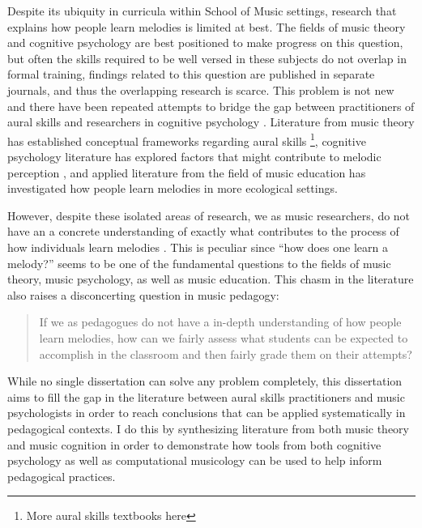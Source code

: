 \documentclass[]{book}
\let\rmarkdownfootnote\footnote%
\def\footnote{\protect\rmarkdownfootnote}
\begin{document}
Despite its ubiquity in curricula within School of Music settings, research that explains how people learn melodies is limited at best.
The fields of music theory and cognitive psychology are best positioned to make progress on this question, but often the skills required to be well versed in these subjects do not overlap in formal training, findings related to this question are published in separate journals, and thus the overlapping research is scarce.
This problem is not new and there have been repeated attempts to bridge the gap between practitioners of aural skills and researchers in cognitive psychology \citep{butlerBridgesUnbuiltComparing1993, davidbutlerWhyGulfMusic1997a, klonoskiImprovingDictationAuralSkills2006, klonoskiPerceptualLearningHierarchy2000, pembrookSendHelpAural1990, karpinskiAuralSkillsAcquisition2000}.
Literature from music theory has established conceptual frameworks regarding aural skills \citep{karpinskiAuralSkillsAcquisition2000}\footnote{More aural skills textbooks here}, cognitive psychology literature has explored factors that might contribute to melodic perception \citep{dowlingExpectancyAttentionMelody1990, dowlingScaleContourTwo1978, dowlingTonalStrengthMelody1991, halpernMemoryMelodies2010}, and applied literature from the field of music education \citep{buonviriEffectsTwoListening2017, buonviriMelodicDictationInstruction2015, paneyEffectDirectingAttention2016} has investigated how people learn melodies in more ecological settings.

However, despite these isolated areas of research, we as music researchers, do not have an a concrete understanding of exactly what contributes to the process of how individuals learn melodies \citep{halpernMemoryMelodies2010}.
This is peculiar since ``how does one learn a melody?'' seems to be one of the fundamental questions to the fields of music theory, music psychology, as well as music education.
This chasm in the literature also raises a disconcerting question in music pedagogy:

\begin{quote}
If we as pedagogues do not have a in-depth understanding of how people learn melodies, how can we fairly assess what students can be expected to accomplish in the classroom and then fairly grade them on their attempts?
\end{quote}

While no single dissertation can solve any problem completely, this dissertation aims to fill the gap in the literature between aural skills practitioners and music psychologists in order to reach conclusions that can be applied systematically in pedagogical contexts.
I do this by synthesizing literature from both music theory and music cognition in order to demonstrate how tools from both cognitive psychology as well as computational musicology can be used to help inform pedagogical practices.
\end{document}
